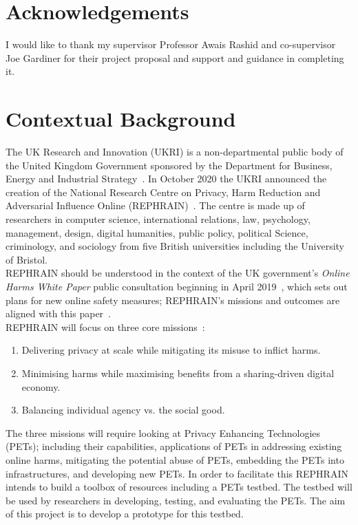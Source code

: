 \documentclass[
    author={Jacob Daniel Halsey},
    supervisor={Prof. Awais Rashid},
    degree={BSc},
    title={Building a Testbed for Evaluating Privacy Enhancing Technologies  (PETs)},
    subtitle={},
    type={software development},
    year={2021}
]{dissertation}
\begin{document}
\chapter*{Acknowledgements}

I would like to thank my supervisor Professor Awais Rashid and co-supervisor Joe Gardiner for their
project proposal and support and guidance in completing it.

\mainmatter


\chapter{Contextual Background}
\label{chap:context}

The UK Research and Innovation (UKRI) is a non-departmental public body of the United Kingdom Government
sponsored by the Department for Business, Energy and Industrial Strategy~\cite{ukri_who_we_are}.
In October 2020 the UKRI announced the creation of the National Research Centre on Privacy, Harm Reduction
and Adversarial Influence Online (REPHRAIN)~\cite{ukri_new_centre}.
The centre is made up of researchers in computer science, international relations, law, psychology, management,
design, digital humanities, public policy, political Science, criminology, and sociology from five British
universities including the University of Bristol. \\

REPHRAIN should be understood in the context of the UK government's \emph{Online Harms White Paper} public
consultation beginning in April 2019~\cite{uk_gov_online_harms}, which sets out plans for new online safety 
measures; REPHRAIN's missions and outcomes are aligned with this paper~\cite{rephrain_harms}. \\

REPHRAIN will focus on three core missions~\cite{rephrain_missions}:

\begin{enumerate}
	\item Delivering privacy at scale while mitigating its misuse to inflict harms.
	\item Minimising harms while maximising benefits from a sharing-driven digital economy.
	\item Balancing individual agency vs. the social good.
\end{enumerate}

The three missions will require looking at Privacy Enhancing Technologies (PETs); including their capabilities,
applications of PETs in addressing existing online harms, mitigating the potential abuse of PETs, embedding the PETs
into infrastructures, and developing new PETs.
In order to facilitate this REPHRAIN intends to build a toolbox of resources including a PETs testbed. The testbed
will be used by researchers in developing, testing, and evaluating the PETs. 
The aim of this project is to develop a prototype for this testbed.
\end{document}
